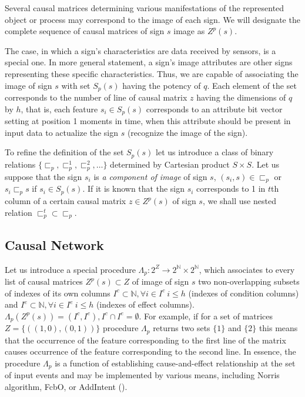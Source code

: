 \documentclass[review]{elsarticle}
\begin{document}
Several causal matrices determining various manifestations of the represented object or process may correspond to the image of each sign. We will designate the complete sequence of causal matrices of sign $s$ image as $Z^p(s)$. 

The case, in which a sign's characteristics are data received by sensors, is a special one. In more general statement, a sign's image attributes are other signs representing these specific characteristics. Thus, we are capable of associating the image of sign $s$ with set $S_p(s)$ having the potency of $q$. Each element of the set corresponds to the number of line of causal matrix $z$ having the dimensions of $q$ by $h$, that is, each feature $s_i\in S_p(s)$ corresponds to an attribute bit vector setting at position 1 moments in time, when this attribute should be present in input data to actualize the sign $s$ (recognize the image of the sign). 

To refine the definition of the set $S_p(s)$ let us introduce a class of binary relations $\{\sqsubset_p,\sqsubset_p^1,\sqsubset_p^2,\dots\}$ determined by Cartesian product $S\times S$. Let us suppose that the sign $s_i$ is \textit{a component of image} of sign $s$, $(s_i,s)\in\sqsubset_p$ or $s_i\sqsubset_p s$ if $s_i\in S_p(s)$. If it is known that the sign $s_i$ corresponds to 1 in $t$th column of a certain causal matrix $z\in Z^p(s)$ of sign $s$, we shall use nested relation $\sqsubset_p^t\subset \sqsubset_p$.

\subsection{Causal Network}

Let us introduce a special procedure $\Lambda_p: 2^Z\rightarrow 2^{\mathbb N}\times 2^{\mathbb N}$, which associates to every list of causal matrices $Z^p(s)\subset Z$ of image of sign $s$ two non-overlapping subsets of indexes of its own columns $I^c\subset\mathbb N, \forall i\in I^c\ i\leq h$ (indexes of condition columns) and $I^e\subset\mathbb N, \forall i\in I^e\ i\leq h$ (indexes of effect columns). $\Lambda_p(Z^p(s))=(I^c,I^e), I^c\cap I^e=\emptyset$. For example, if for a set of matrices $Z=\{((1, 0), (0, 1))\}$ procedure $\Lambda_p$ returns two sets $\{1\}$ and $\{2\}$ this means that the occurrence of the feature corresponding to the first line of the matrix causes occurrence of the feature corresponding to the second line. In essence, the procedure $\Lambda_p$ is a function of establishing cause-and-effect relationship at the set of input events and may be implemented by various means, including Norris algorithm, FcbO, or AddIntent (\cite{Norris1978,Krajca2010,Merwe2004}).
\end{document}
